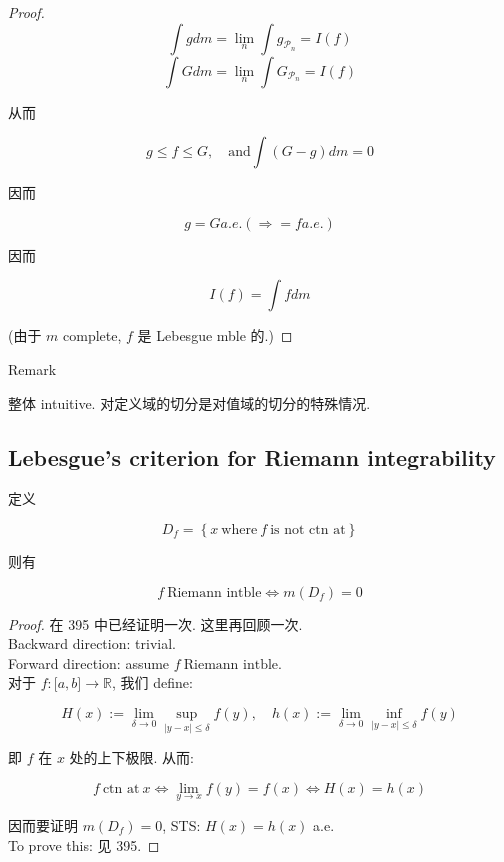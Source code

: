 \begin{proof}
\[\int g dm = \lim\limits_{n}\int g_{\mathcal{P}_{n}} = I(f)\]\[\int G dm = \lim\limits_{n}\int G_{\mathcal{P}_{n}} = I(f)\]

从而

\[g \leq f \leq G,\quad\text{and}\int(G - g) dm = 0\]

因而

\[g = G a.e.(\Longrightarrow = f a.e.)\]

因而

\[I(f) = \int f dm\]

(由于 \(m\) complete, \(f\) 是 Lebesgue mble 的.)

\end{proof}

\begin{qlremark}{Remark}

整体 intuitive. 对定义域的切分是对值域的切分的特殊情况.

\end{qlremark}

\subsection{Lebesgue's criterion for Riemann integrability}\label{lebesgues-criterion-for-riemann-integrability}

\begin{theorem}{}

定义

\[D_{f} = \left\{ {x\ \text{where}\ f\ \text{is not ctn at}} \right\}\]

则有

\[f\ \text{Riemann intble}\Leftrightarrow m(D_{f}) = 0\]

\end{theorem}

\begin{proof}

在 395 中已经证明一次. 这里再回顾一次.\\
Backward direction: trivial.\\
Forward direction: assume \(f\ \text{Riemann intble}\).\\
对于 \(f:\lbrack a,b\rbrack\rightarrow\mathbb{R}\), 我们 define:

\[H(x) := \lim\limits_{\delta\rightarrow 0}\sup\limits_{|y - x| \leq \delta}f(y),\quad h(x) := \lim\limits_{\delta\rightarrow 0}\inf\limits_{|y - x| \leq \delta}f(y)\]

即 \(f\) 在 \(x\) 处的上下极限. 从而:

\[f\ \text{ctn at}\ x\Leftrightarrow\lim\limits_{y\rightarrow x}f(y) = f(x)\Leftrightarrow H(x) = h(x)\]

因而要证明 \(m(D_{f}) = 0\), STS: \(H(x) = h(x)\) a.e.\\
To prove this: 见 395.

\end{proof}

